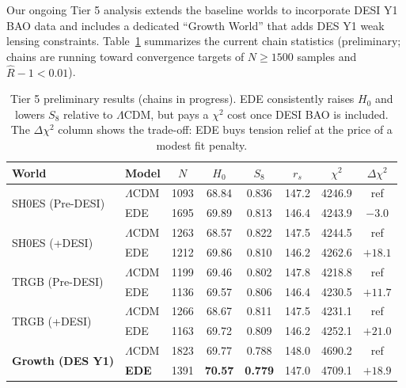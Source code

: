 \documentclass[a4paper,11pt]{article}
\begin{document}
Our ongoing Tier 5 analysis extends the baseline worlds to incorporate DESI Y1 BAO data and includes a dedicated ``Growth World'' that adds DES Y1 weak lensing constraints. Table~\ref{tab:tier5_running} summarizes the current chain statistics (preliminary; chains are running toward convergence targets of $N \geq 1500$ samples and $\hat{R} - 1 < 0.01$).

\begin{table}[h]
\centering
\caption{Tier 5 preliminary results (chains in progress). EDE consistently raises $H_0$ and lowers $S_8$ relative to $\Lambda$CDM, but pays a $\chi^2$ cost once DESI BAO is included. The $\Delta\chi^2$ column shows the trade-off: EDE buys tension relief at the price of a modest fit penalty.}
\label{tab:tier5_running}
\begin{tabular}{llcccccc}
\toprule
World & Model & $N$ & $H_0$ & $S_8$ & $r_s$ & $\chi^2$ & $\Delta\chi^2$ \\
\midrule
\multirow{2}{*}{SH0ES (Pre-DESI)} 
 & $\Lambda$CDM & 1093 & 68.84 & 0.836 & 147.2 & 4246.9 & ref \\
 & EDE & 1695 & 69.89 & 0.813 & 146.4 & 4243.9 & $\mathbf{-3.0}$ \\
\midrule
\multirow{2}{*}{SH0ES (+DESI)} 
 & $\Lambda$CDM & 1263 & 68.57 & 0.822 & 147.5 & 4244.5 & ref \\
 & EDE & 1212 & 69.86 & 0.810 & 146.2 & 4262.6 & $+18.1$ \\
\midrule
\multirow{2}{*}{TRGB (Pre-DESI)} 
 & $\Lambda$CDM & 1199 & 69.46 & 0.802 & 147.8 & 4218.8 & ref \\
 & EDE & 1136 & 69.57 & 0.806 & 146.4 & 4230.5 & $+11.7$ \\
\midrule
\multirow{2}{*}{TRGB (+DESI)} 
 & $\Lambda$CDM & 1266 & 68.67 & 0.811 & 147.5 & 4231.1 & ref \\
 & EDE & 1163 & 69.72 & 0.809 & 146.2 & 4252.1 & $+21.0$ \\
\midrule
\multirow{2}{*}{\textbf{Growth (DES Y1)}} 
 & $\Lambda$CDM & 1823 & 69.77 & 0.788 & 148.0 & 4690.2 & ref \\
 & \textbf{EDE} & 1391 & \textbf{70.57} & \textbf{0.779} & 147.0 & 4709.1 & $+18.9$ \\
\bottomrule
\end{tabular}
\end{table}
\end{document}
